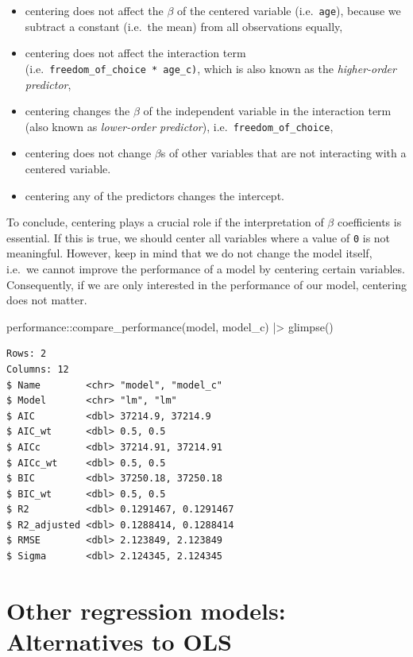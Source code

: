 \documentclass[
  letterpaper,
]{krantz}
\makeatletter
\newenvironment{Shaded}{\begin{snugshade}}{\end{snugshade}}
\newcommand{\FunctionTok}[1]{\textcolor[rgb]{0.28,0.35,0.67}{#1}}
\newcommand{\NormalTok}[1]{\textcolor[rgb]{0.00,0.23,0.31}{#1}}
\newcommand{\SpecialCharTok}[1]{\textcolor[rgb]{0.37,0.37,0.37}{#1}}
\newenvironment{kframe}{%
\medskip{}
\setlength{\fboxsep}{.8em}
 \def\at@end@of@kframe{}%
 \ifinner\ifhmode%
  \def\at@end@of@kframe{\end{minipage}}%
  \begin{minipage}{\columnwidth}%
 \fi\fi%
 \def\FrameCommand##1{\hskip\@totalleftmargin \hskip-\fboxsep
 \colorbox{shadecolor}{##1}\hskip-\fboxsep
     \hskip-\linewidth \hskip-\@totalleftmargin \hskip\columnwidth}%
 \MakeFramed {\advance\hsize-\width
   \@totalleftmargin\z@ \linewidth\hsize
   \@setminipage}}%
 {\par\unskip\endMakeFramed%
 \at@end@of@kframe}
\renewenvironment{Shaded}{\begin{kframe}}{\end{kframe}}
\makeatother
\begin{document}
\begin{itemize}
\item
  centering does not affect the \(\beta\) of the centered variable
  (i.e.~\texttt{age}), because we subtract a constant (i.e.~the mean)
  from all observations equally,
\item
  centering does not affect the interaction term
  (i.e.~\texttt{freedom\_of\_choice\ *\ age\_c)}, which is also known as
  the \emph{higher-order predictor},
\item
  centering changes the \(\beta\) of the independent variable in the
  interaction term (also known as \emph{lower-order predictor}),
  i.e.~\texttt{freedom\_of\_choice},
\item
  centering does not change \(\beta\)s of other variables that are not
  interacting with a centered variable.
\item
  centering any of the predictors changes the intercept.
\end{itemize}

To conclude, centering plays a crucial role if the interpretation of
\(\beta\) coefficients is essential. If this is true, we should center
all variables where a value of \texttt{0} is not meaningful. However,
keep in mind that we do not change the model itself, i.e.~we cannot
improve the performance of a model by centering certain variables.
Consequently, if we are only interested in the performance of our model,
centering does not matter.

\begin{Shaded}
\begin{Highlighting}[]
\NormalTok{performance}\SpecialCharTok{::}\FunctionTok{compare\_performance}\NormalTok{(model, model\_c) }\SpecialCharTok{|\textgreater{}}
  \FunctionTok{glimpse}\NormalTok{()}
\end{Highlighting}
\end{Shaded}

\begin{verbatim}
Rows: 2
Columns: 12
$ Name        <chr> "model", "model_c"
$ Model       <chr> "lm", "lm"
$ AIC         <dbl> 37214.9, 37214.9
$ AIC_wt      <dbl> 0.5, 0.5
$ AICc        <dbl> 37214.91, 37214.91
$ AICc_wt     <dbl> 0.5, 0.5
$ BIC         <dbl> 37250.18, 37250.18
$ BIC_wt      <dbl> 0.5, 0.5
$ R2          <dbl> 0.1291467, 0.1291467
$ R2_adjusted <dbl> 0.1288414, 0.1288414
$ RMSE        <dbl> 2.123849, 2.123849
$ Sigma       <dbl> 2.124345, 2.124345
\end{verbatim}

\section{Other regression models: Alternatives to
OLS}\label{sec-ols-alternatives}
\end{document}
